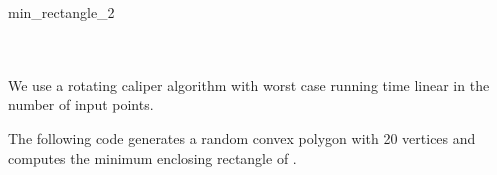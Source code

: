 \begin{ccRefFunction}{min_rectangle_2}
  \ccSeeAlso
  \\
  \\
  \\

  \ccImplementation We use a rotating caliper algorithm
  \cite{t-sgprc-83} with worst case running time linear in the number
  of input points.
  
  \ccExample The following code generates a random convex polygon
   with 20 vertices and computes the minimum enclosing
  rectangle of .


\end{ccRefFunction}
    
